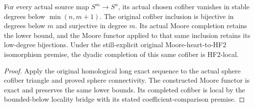 \begin{proposition}
  \label{prop:actual-source-sphere-cofiber-bounds}
  \leanok
  For every actual source map $S^m\to S^n$, its actual chosen cofiber vanishes in stable degrees below $\min(n,m+1)$. The original cofiber inclusion is bijective in degrees below $m$ and surjective in degree $m$. Its actual Moore completion retains the lower bound, and the Moore functor applied to that same inclusion retains its low-degree bijections. Under the still-explicit original Moore-heart-to-HF2 isomorphism premise, the dyadic completion of this same cofiber is HF2-local.
\end{proposition}
\begin{proof}
  Apply the original homological long exact sequence to the actual sphere cofiber triangle and proved sphere connectivity. The constructed Moore functor is exact and preserves the same lower bounds. Its completed cofiber is local by the bounded-below locality bridge with its stated coefficient-comparison premise.
  \leanok
\end{proof}


